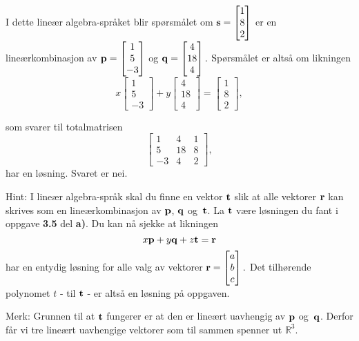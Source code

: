 \begin{losning}
\begin{punkt}
I dette lineær algebra-språket blir spørsmålet om $\mathbf{s}=\begin{bmatrix}
1\\
8\\
2
\end{bmatrix}$ er en lineærkombinasjon av $\mathbf{p}=\begin{bmatrix}
1\\
5\\
-3
\end{bmatrix}$ og $\mathbf{q}=\begin{bmatrix}
4\\
18\\
4
\end{bmatrix}.$ Spørsmålet er altså om likningen $$x\begin{bmatrix}
1\\
5\\
-3
\end{bmatrix}+y\begin{bmatrix}
4\\
18\\
4
\end{bmatrix}=\begin{bmatrix}
1\\
8\\
2
\end{bmatrix},$$ 

som svarer til totalmatrisen $$\begin{bmatrix}
1  & 4  & 1\\
5  & 18 & 8\\
-3 & 4  & 2
\end{bmatrix},$$ har en løsning. Svaret er nei.
\end{punkt}

\begin{punkt}
Hint: I lineær algebra-språk skal du finne en vektor $\mathbf{t}$ slik at alle vektorer $\mathbf{r}$ kan skrives som en lineærkombinasjon av $\mathbf{p}$, $\mathbf{q}$ og~$\mathbf{t}$. La $\mathbf{t}$ være løsningen du fant i oppgave \textbf{3.5} del \textbf{a)}. Du kan nå sjekke at likningen $$x\mathbf{p}+y\mathbf{q}+z\mathbf{t}=\mathbf{r}$$ har en entydig løsning for alle valg av vektorer $\mathbf{r}=\begin{bmatrix}
a\\
b\\
c
\end{bmatrix}.$ Det tilhørende polynomet $t$ - til $\mathbf{t}$ - er altså en løsning på oppgaven.

Merk: Grunnen til at $\mathbf{t}$ fungerer er at den er lineært uavhengig av $\mathbf{p}$ og~$\mathbf{q}$. Derfor får vi tre lineært uavhengige vektorer som til sammen spenner ut $\mathbb{R}^3.$
\end{punkt}

\end{losning}







